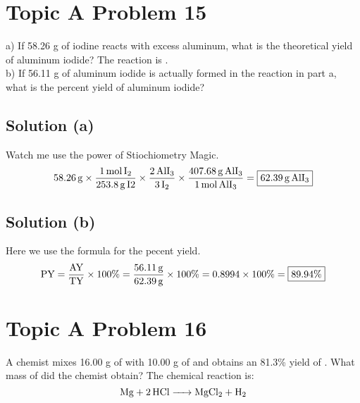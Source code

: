 \documentclass[10pt]{article}
\begin{document}
    \pagebreak
    \section{Topic A Problem 15}
        a) If 58.26 g of iodine reacts with excess aluminum, what is the theoretical yield of aluminum iodide? 
        The reaction is .\\
        b) If 56.11 g of aluminum iodide is actually formed in the reaction in part a, what is the percent yield of aluminum iodide?

        \subsection{Solution (a)}
            Watch me use the power of Stiochiometry Magic.
            \begin{equation}
                58.26\,\unit{\gram} \times  \frac{1\,\unit{\mole}\,\ce{I2}}{253.8\,\unit{\gram}\,\unit{I2}}
                                    \times  \frac{2\,\ce{AlI3}}{3\,\ce{I2}}
                                    \times  \frac{407.68\,\unit{\gram}\,\ce{AlI3}}{1\,\unit{\mole}\,\ce{AlI3}}
                    =   \boxed{62.39\,\unit{\gram}\,\ce{AlI3}}
            \end{equation}
        
        \subsection{Solution (b)}
            Here we use the formula for the pecent yield.
            \begin{equation}
                \text{PY}   =   \frac{\rm AY}{\rm TY}   \times  100\%
                    =   \frac{56.11\,\unit{\gram}}{62.39\,\unit{\gram}} \times  100\%
                    =   0.8994 \times 100\%
                    =   \boxed{89.94\%}
            \end{equation}
        

    \pagebreak
    \section{Topic A Problem 16}
        A chemist mixes 16.00 g of  with 10.00 g of  and obtains an 81.3\% yield of .
        What mass of  did the chemist obtain? 
        The chemical reaction is:
        \begin{equation}
            \ce{Mg + 2 HCl -> MgCl2 + H2}
        \end{equation}
\end{document}
